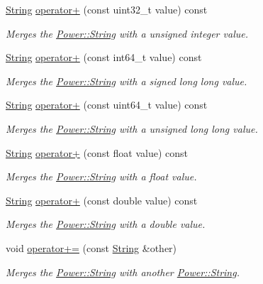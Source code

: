 \begin{DoxyCompactItemize}
\hyperlink{class_power_1_1_string}{String} \hyperlink{class_power_1_1_string_afc7e926554a6e77bd4e34e850f08fa35}{operator+} (const uint32\+\_\+t value) const
\begin{DoxyCompactList}\small\item\em Merges the \hyperlink{class_power_1_1_string}{Power\+::\+String} with a unsigned integer value. \end{DoxyCompactList}\item 
\hyperlink{class_power_1_1_string}{String} \hyperlink{class_power_1_1_string_a6786c4c855394ed972fcee194f5b0b59}{operator+} (const int64\+\_\+t value) const
\begin{DoxyCompactList}\small\item\em Merges the \hyperlink{class_power_1_1_string}{Power\+::\+String} with a signed long long value. \end{DoxyCompactList}\item 
\hyperlink{class_power_1_1_string}{String} \hyperlink{class_power_1_1_string_aeff2ea13da477a4e313cdac2fcea1856}{operator+} (const uint64\+\_\+t value) const
\begin{DoxyCompactList}\small\item\em Merges the \hyperlink{class_power_1_1_string}{Power\+::\+String} with a unsigned long long value. \end{DoxyCompactList}\item 
\hyperlink{class_power_1_1_string}{String} \hyperlink{class_power_1_1_string_a011603e62e9254d7b2a95314ddaca716}{operator+} (const float value) const
\begin{DoxyCompactList}\small\item\em Merges the \hyperlink{class_power_1_1_string}{Power\+::\+String} with a float value. \end{DoxyCompactList}\item 
\hyperlink{class_power_1_1_string}{String} \hyperlink{class_power_1_1_string_a0957d2856d8e5693a49fef4812629459}{operator+} (const double value) const
\begin{DoxyCompactList}\small\item\em Merges the \hyperlink{class_power_1_1_string}{Power\+::\+String} with a double value. \end{DoxyCompactList}\item 
void \hyperlink{class_power_1_1_string_aad7a34466104387cc33cafcf04770b39}{operator+=} (const \hyperlink{class_power_1_1_string}{String} \&other)
\begin{DoxyCompactList}\small\item\em Merges the \hyperlink{class_power_1_1_string}{Power\+::\+String} with another \hyperlink{class_power_1_1_string}{Power\+::\+String}. \end{DoxyCompactList}\item 

\end{DoxyCompactItemize}
